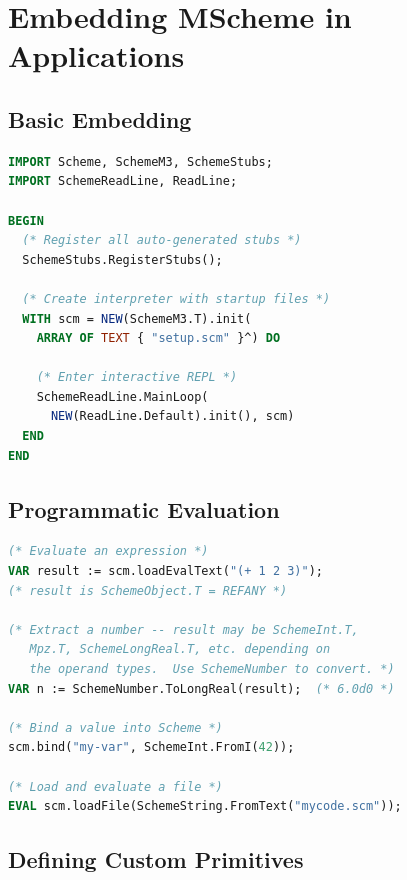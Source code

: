 \documentclass[12pt]{report}
\begin{document}
\chapter{Embedding MScheme in Applications}

\section{Basic Embedding}

\begin{lstlisting}[language=Modula3]
IMPORT Scheme, SchemeM3, SchemeStubs;
IMPORT SchemeReadLine, ReadLine;

BEGIN
  (* Register all auto-generated stubs *)
  SchemeStubs.RegisterStubs();

  (* Create interpreter with startup files *)
  WITH scm = NEW(SchemeM3.T).init(
    ARRAY OF TEXT { "setup.scm" }^) DO

    (* Enter interactive REPL *)
    SchemeReadLine.MainLoop(
      NEW(ReadLine.Default).init(), scm)
  END
END
\end{lstlisting}

\section{Programmatic Evaluation}

\begin{lstlisting}[language=Modula3]
(* Evaluate an expression *)
VAR result := scm.loadEvalText("(+ 1 2 3)");
(* result is SchemeObject.T = REFANY *)

(* Extract a number -- result may be SchemeInt.T,
   Mpz.T, SchemeLongReal.T, etc. depending on
   the operand types.  Use SchemeNumber to convert. *)
VAR n := SchemeNumber.ToLongReal(result);  (* 6.0d0 *)

(* Bind a value into Scheme *)
scm.bind("my-var", SchemeInt.FromI(42));

(* Load and evaluate a file *)
EVAL scm.loadFile(SchemeString.FromText("mycode.scm"));
\end{lstlisting}

\section{Defining Custom Primitives}
\end{document}
